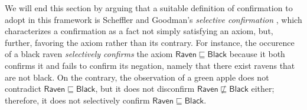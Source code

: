 \documentclass{llncs}
\begin{document}
We will end this section by arguing that a suitable definition of confirmation to adopt in this
framework is Scheffler and Goodman's \emph{selective confirmation} \cite{SchefflerGoodman1972},
which characterizes a confirmation as a fact not simply satisfying an axiom, but, further,
favoring the axiom rather than its contrary.
For instance, the occurence of a black raven \emph{selectively confirms} the axiom
$\mathsf{Raven} \sqsubseteq \mathsf{Black}$ because it both confirms it and fails to confirm its
negation, namely that there exist ravens that are not black. On the contrary, the observation of
a green apple does not contradict $\mathsf{Raven} \sqsubseteq \mathsf{Black}$,
but it does not disconfirm $\mathsf{Raven} \not\sqsubseteq \mathsf{Black}$
either; therefore, it does not selectively confirm $\mathsf{Raven} \sqsubseteq \mathsf{Black}$.
\end{document}
